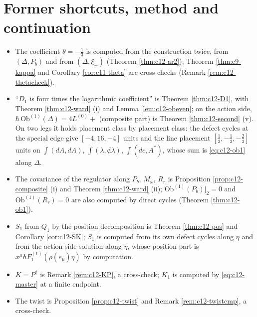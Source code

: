 \section{Former shortcuts, method and continuation}

\begin{remark}
\label{rem:c12-shortcuts}
\begin{itemize}
\item The coefficient $\theta=-\tfrac13$ is computed from the construction twice, from $(\Delta,P_b)$ and from $(\Delta,\xi_\pm)$ (Theorem \ref{thm:c12-ar2}); Theorem \ref{thm:c9-kappa} and Corollary \ref{cor:c11-theta} are cross-checks (Remark \ref{rem:c12-thetacheck}).
\item ``$D_1$ is four times the logarithmic coefficient'' is Theorem \ref{thm:c12-D1}, with Theorem \ref{thm:c12-ward} (i) and Lemma \ref{lem:c12-obeven}; on the action side, $\hbar\,\mathrm{Ob}^{(1)}(\Delta)=4L^{(0)}+$ (composite part) is Theorem \ref{thm:c12-second} (v). On two legs it holds placement class by placement class: the defect cycles at the special edge give $[-4,16,-4]$ units and the line placement $[\tfrac13,-\tfrac13,-\tfrac23]$ units on $\int(dA,dA)$, $\int(\lambda,{\not d}\lambda)$, $\int(dc,A^*)$, whose sum is \eqref{eq:c12-ob1} along $\Delta$.
\item The covariance of the regulator along $P_b$, $M_\omega$, $R_r$ is Proposition \ref{prop:c12-composite} (i) and Theorem \ref{thm:c12-ward} (ii); $\mathrm{Ob}^{(1)}(P_b)|_2=0$ and $\mathrm{Ob}^{(1)}(R_r)=0$ are also computed by direct cycles (Theorem \ref{thm:c12-ob1}).
\item $S_1$ from $Q_1$ by the position decomposition is Theorem \ref{thm:c12-pos} and Corollary \ref{cor:c12-SK}; $S_1$ is computed from its own defect cycles along $\eta$ and from the action-side solution along $\eta$, whose position part is $x^\mu\hbar F_1^{(1)}(\rho(e_\mu)\eta)$ by computation.
\item $K=P^\dagger$ is Remark \ref{rem:c12-KP}, a cross-check; $K_1$ is computed by \eqref{eq:c12-master} at a finite endpoint.
\item The twist is Proposition \ref{prop:c12-twist} and Remark \ref{rem:c12-twistcmp}, a cross-check.
\end{itemize}
\end{remark}


